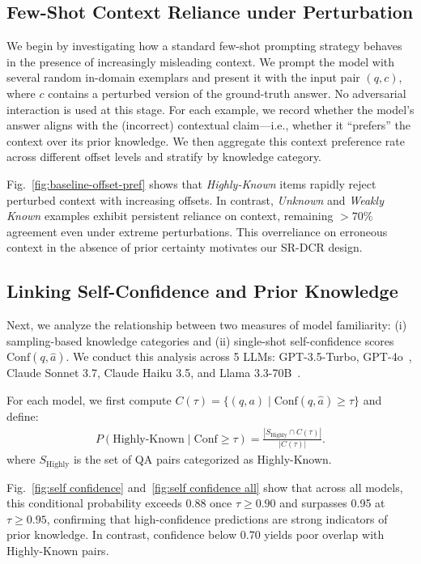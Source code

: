 \documentclass[11pt]{article}
\begin{document}
\subsection{Few-Shot Context Reliance under Perturbation}
\label{subsec:baseline-offset}

We begin by investigating how a standard few-shot prompting strategy behaves in the presence of increasingly misleading context. We prompt the model with several random in-domain exemplars and present it with the input pair \((q, c)\), where \(c\) contains a perturbed version of the ground-truth answer. No adversarial interaction is used at this stage. For each example, we record whether the model's answer aligns with the (incorrect) contextual claim—i.e., whether it “prefers” the context over its prior knowledge. We then aggregate this context preference rate across different offset levels and stratify by knowledge category.

Fig.~\ref{fig:baseline-offset-pref} shows that \emph{Highly-Known} items rapidly reject perturbed context with increasing offsets. In contrast, \emph{Unknown} and \emph{Weakly Known} examples exhibit persistent reliance on context, remaining $>70\%$ agreement even under extreme perturbations. This overreliance on erroneous context in the absence of prior certainty motivates our SR-DCR design.


\subsection{Linking Self-Confidence and Prior Knowledge}

Next, we analyze the relationship between two measures of model familiarity: (i) sampling-based knowledge categories and (ii) single-shot self-confidence scores \(\mathrm{Conf}(q,\hat{a})\). We conduct this analysis across 5 LLMs: GPT-3.5-Turbo, GPT-4o~\citep{openai2023gpt4}, Claude Sonnet 3.7, Claude Haiku 3.5, and Llama 3.3-70B~\citep{meta2024llama3}.

For each model, we first compute \(C(\tau) = \{(q,a) \mid \mathrm{Conf}(q,\hat{a}) \ge \tau\}\) and define:
\small
\begin{align*}
P(\text{Highly-Known} \mid \mathrm{Conf} \ge \tau) = \frac{\left| S_{\mathrm{Highly}} \cap C(\tau) \right|}{\left| C(\tau) \right|}.
\end{align*}
\normalsize
where \(S_{\mathrm{Highly}}\) is the set of QA pairs categorized as Highly-Known.

Fig.~\ref{fig:self confidence} and~\ref{fig:self confidence all} show that across all models, this conditional probability exceeds 0.88 once \(\tau \ge 0.90\) and surpasses 0.95 at \(\tau \ge 0.95\), confirming that high-confidence predictions are strong indicators of prior knowledge. In contrast, confidence below 0.70 yields poor overlap with Highly-Known pairs.
\end{document}
